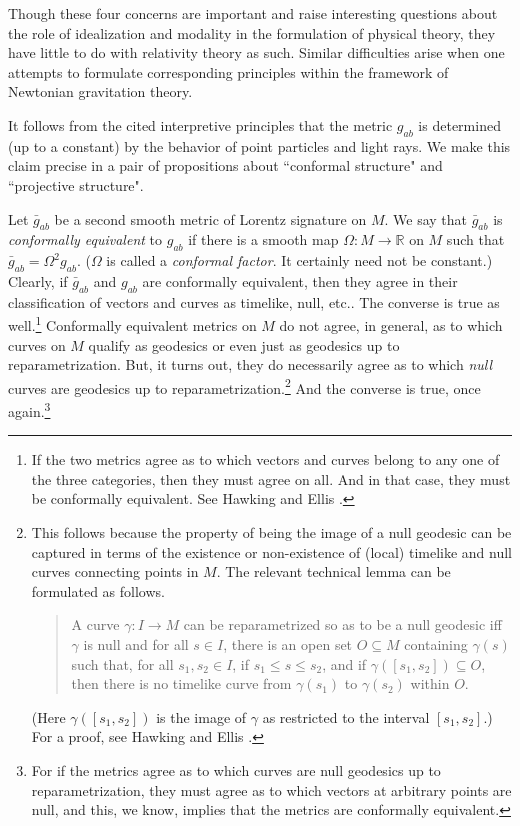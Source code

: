 \documentclass [12] {article}
\theoremstyle{plain}
\numberwithin{figure}{subsection}
\numberwithin{proposition}{subsection}
\begin{document}
Though these four concerns are important and raise interesting questions about the role of idealization and modality in the formulation of physical theory,  they have little to do with relativity theory as such. Similar difficulties arise when one attempts to formulate corresponding principles within the framework of Newtonian gravitation theory.

It follows from the cited interpretive principles that the metric $g_{ab}$ is determined (up to a constant) by the behavior of point particles and  light rays.   We make this claim precise in a pair of propositions about ``conformal structure" and ``projective structure".

Let $\bar{g}_{ab}$ be a second smooth metric of Lorentz signature on $M$.   We say that $\bar{g}_{ab}$ is \emph{conformally equivalent} to $g_{ab}$ if there is a smooth map $\Omega \! : M \rightarrow \mathbb{R}$ on $M$ such that $\bar{g}_{ab} = \Omega^2 g_{ab}$.  ($\Omega$ is called a \emph{conformal factor}. It certainly need not be constant.) Clearly, if $\bar{g}_{ab}$ and $g_{ab}$ are conformally equivalent, then they agree in their classification of vectors and curves as timelike, null, etc..  The converse is true as well.\footnote{If the two metrics agree as to which vectors and curves belong to any one of the three categories, then they must agree on all. And in that case, they must be conformally equivalent. See Hawking and Ellis .} 
Conformally equivalent metrics on $M$ do not agree, in general,  as to which curves on $M$ qualify as geodesics or even just as geodesics up to reparametrization.   But, it turns out, they do necessarily agree as to which \emph{null} curves are geodesics up to reparametrization.\footnote{This follows because the property of being the image of a null geodesic can be captured in terms of the existence or non-existence of (local) timelike and null curves connecting points in $M$. The relevant technical lemma can be formulated as follows. 
\begin{quote}
A curve $\gamma \! \! : I \rightarrow M$  can be reparametrized 
so as to be a null geodesic  iff $\gamma$ is null  and for all $s \in I$, there is an open set $O \subseteq M$ containing $\gamma(s)$ such that, for all $s_1, s_2 \in I$, if $s_1 \le s \le s_2$, and if $\gamma ([s_1, s_2 ]) \subseteq O$, then there is no timelike curve from $\gamma(s_1)$ to $\gamma(s_2)$  within $O$. 
\end{quote}
(Here $\gamma ([s_1, s_2 ])$ is the image of   $\gamma$ as restricted to the interval  $[s_1, s_2 ]$.)  For a proof, see Hawking and Ellis .}  And the converse is true, once again.\footnote{For if the metrics agree as to which curves are null geodesics up to reparametrization, they must agree as to which vectors at arbitrary points are null, and this, we know, implies that the metrics are conformally equivalent.} 
\end{document}
